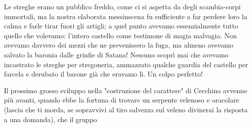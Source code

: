 Le streghe erano un pubblico freddo, come ci si aspetta da degli scambia-corpi immortali, ma la nostra elaborata messinscena fu sufficiente a far perdere loro la calma e farle tirar fuori gli artigli; a quel punto avevamo essenzialmente tutto quello che volevamo: l'intero castello come testimone di magia malvagia. Non avevamo davvero dei mezzi che ne prevenissero la fuga, ma almeno avevamo salvato la baronia dalle grinfie di Satana! Nessuno scoprì mai che avevamo incastrato le streghe per stregoneria, ammazzato qualche guardia del castello per farcela e derubato il barone già che eravamo lì. Un colpo perfetto!

Il prossimo grosso sviluppo nella "costruzione del carattere" di Cecchino avvenne più avanti, quando ebbe la fortuna di trovare un serpente velenoso e oracolare (lascia che ti morda, se sopravvivi al tiro salvezza sul veleno divinerai la risposta a una domanda), che il gruppo
